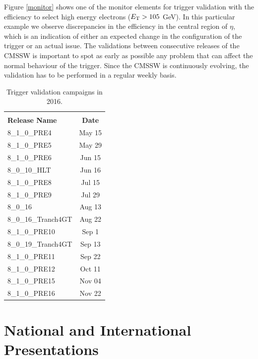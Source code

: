 Figure \ref{monitor} shows one of the monitor elements for trigger validation with the efficiency to select high energy electrons ($E_{\rm T}> 105$ GeV). In this particular example we observe discrepancies in the efficiency in the central region of $\eta$, which is an indication of either an expected change in the configuration of the trigger or an actual issue. The validations between consecutive releases of the CMSSW is important to spot as early as possible any problem that can affect the normal behaviour of the trigger. Since the CMSSW is continuously evolving, the validation has to be performed in a regular weekly basis. 


\begin{table}[htb]
\centering
\caption[Trigger validation campaigns in 2016]{Trigger validation campaigns in 2016.}
\label{validations}
\begin{tabular}{lc} \hline
&\\[-0.2cm]
{\bf Release Name} & {\bf Date}  \\[0.2cm]
\hline\hline
{ 8\_1\_0\_PRE4}           & { May 15} \\
{ 8\_1\_0\_PRE5}           & { May 29} \\
{ 8\_1\_0\_PRE6}           & { Jun 15} \\
{ 8\_0\_10\_HLT}           & { Jun 16} \\
{ 8\_1\_0\_PRE8}           & { Jul 15} \\
{ 8\_1\_0\_PRE9}           & { Jul 29} \\
{ 8\_0\_16}                & { Aug 13} \\
{ 8\_0\_16\_Tranch4GT}     & { Aug 22} \\
{ 8\_1\_0\_PRE10}          & { Sep 1 } \\
{ 8\_0\_19\_Tranch4GT}     & { Sep 13} \\
{ 8\_1\_0\_PRE11}          & { Sep 22} \\
{ 8\_1\_0\_PRE12}          & { Oct 11} \\
{ 8\_1\_0\_PRE15}          & { Nov 04} \\
{ 8\_1\_0\_PRE16}          & { Nov 22} \\
\hline
\end{tabular}
\end{table}

\section{National and International Presentations}

